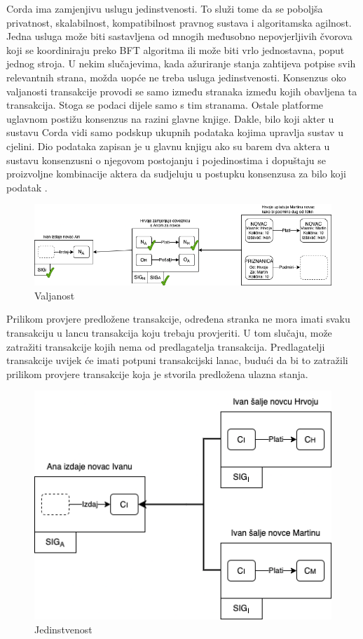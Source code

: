 \documentclass[times, utf8, diplomski]{fer}
\begin{document}
Corda ima zamjenjivu uslugu jedinstvenosti. To služi tome da se poboljša privatnost, skalabilnost, kompatibilnost pravnog sustava i algoritamska agilnost. Jedna usluga može biti sastavljena od mnogih međusobno nepovjerljivih čvorova koji se koordiniraju preko BFT algoritma ili može biti vrlo jednostavna, poput jednog stroja. U nekim slučajevima, kada ažuriranje stanja zahtijeva potpise svih relevantnih strana, možda uopće ne treba usluga jedinstvenosti. Konsenzus oko valjanosti transakcije provodi se samo između stranaka između kojih obavljena ta transakcija. Stoga se podaci dijele samo s tim stranama. Ostale platforme uglavnom postižu konsenzus na razini glavne knjige. Dakle, bilo koji akter u sustavu Corda vidi samo podskup ukupnih podataka kojima upravlja sustav u cjelini. Dio podataka zapisan je u glavnu knjigu ako su barem dva aktera u sustavu konsenzusni o njegovom postojanju i pojedinostima i dopuštaju se proizvoljne kombinacije aktera da sudjeluju u postupku konsenzusa za bilo koji podatak \cite{Corda}.

\begin{figure}[htb]
\centering
\includegraphics[width=12cm]{imgs/Validity consensus.png}
\caption{Valjanost}
\label{fig:validity}
\end{figure}

Prilikom provjere predložene transakcije, određena stranka ne mora imati svaku transakciju u lancu transakcija koju trebaju provjeriti. U tom slučaju,  može zatražiti transakcije kojih nema od predlagatelja transakcija. Predlagatelji transakcije uvijek će imati potpuni transakcijski lanac, budući da bi to zatražili prilikom provjere transakcije koja je stvorila predložena ulazna stanja.

\begin{figure}[htb]
\centering
\includegraphics[width=12cm]{imgs/Uniqueness consensus.png}
\caption{Jedinstvenost}
\label{fig:uniqueness}
\end{figure}
\end{document}
